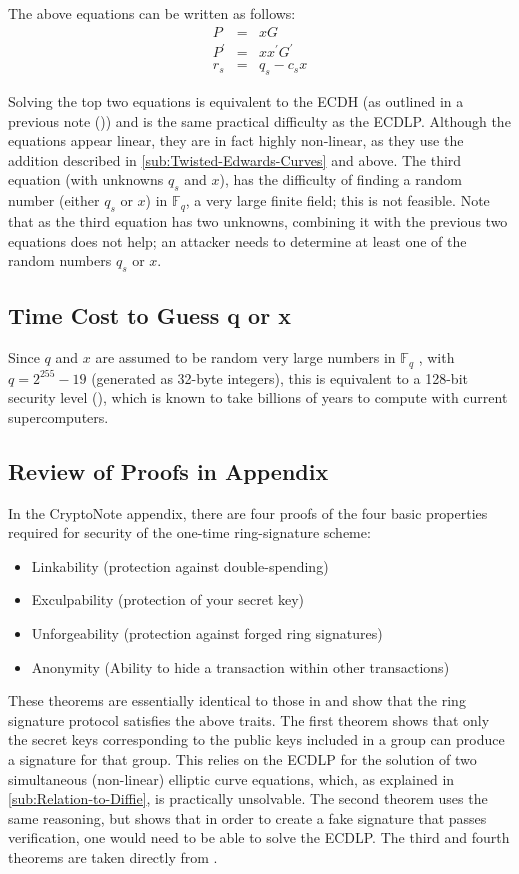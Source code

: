 \documentclass[12pt,english]{mrl}
\numberwithin{equation}{section}
\numberwithin{figure}{section}
\begin{document}
The above equations can be written as follows:
\begin{eqnarray*}
P&=&xG \\
P^{\prime}&=&xx^{\prime}G^{\prime} \\
r_{s}&=&q_{s}-c_{s}x
\end{eqnarray*}

Solving the top two equations
is equivalent to the ECDH (as outlined in a previous note (\cite{SN}))
and is the same practical difficulty as the ECDLP.
Although the equations appear linear, they are in fact highly non-linear,
as they use the addition described in \ref{sub:Twisted-Edwards-Curves} and above.
The third equation (with unknowns $q_{s}$ and $x$), has the difficulty
of finding a random number (either $q_{s}$ or $x$) in $\mathbb{F}_{q}$,
a very large finite field; this is not feasible.
Note that as the third equation has two unknowns, combining
it with the previous two equations does not help; an attacker needs to
determine at least one of the random numbers $q_{s}$ or $x$. 


\subsection{\label{sub:Time-Cost-to}Time Cost to Guess q or x }

Since $q$ and $x$ are assumed to be random very large numbers in
$\mathbb{F}_{q}$ , with $q=2^{255}-19$ (generated as 32-byte
integers), this is equivalent to a 128-bit security level (\cite{BCPM}),
which is known to take billions of years to compute with current supercomputers. 


\subsection{Review of Proofs in Appendix}

In the CryptoNote appendix, there are four proofs of the four basic
properties required for security of the one-time ring-signature scheme:
\begin{itemize}
\item Linkability (protection against double-spending)
\item Exculpability (protection of your secret key)
\item Unforgeability (protection against forged ring signatures)
\item Anonymity (Ability to hide a transaction within other transactions)
\end{itemize}
These theorems are essentially identical to those in \cite{FS} and show that
the ring signature protocol satisfies the above traits. The first
theorem shows that only the secret keys corresponding
to the public keys included in a group can produce a signature for
that group. This relies on the ECDLP for the solution of two simultaneous
(non-linear) elliptic curve equations, which, as explained in \ref{sub:Relation-to-Diffie},
is practically unsolvable. The second theorem uses the same reasoning,
but shows that in order to create a fake signature that passes verification, 
one would need to be able to solve the ECDLP. The third and fourth theorems 
are taken directly from \cite{FS}.
\end{document}
